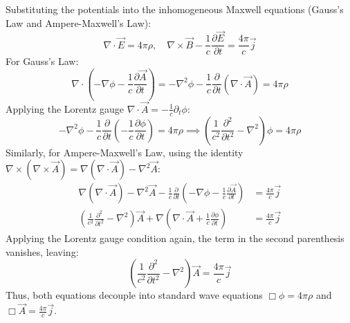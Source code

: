 \begin{solution}
Substituting the potentials into the inhomogeneous Maxwell equations (Gauss's Law and Ampere-Maxwell's Law):
\begin{equation*}
    \nabla \cdot \vec{E} = 4\pi\rho, \quad \nabla \times \vec{B} - \frac{1}{c}\frac{\partial \vec{E}}{\partial t} = \frac{4\pi}{c}\vec{j}
\end{equation*}
For Gauss's Law:
\begin{equation*}
    \nabla \cdot \left( -\nabla \phi - \frac{1}{c}\frac{\partial \vec{A}}{\partial t} \right) = -\nabla^2 \phi - \frac{1}{c}\frac{\partial}{\partial t} (\nabla \cdot \vec{A}) = 4\pi\rho
\end{equation*}
Applying the Lorentz gauge $\nabla \cdot \vec{A} = -\frac{1}{c} \partial_t \phi$:
\begin{equation*}
    -\nabla^2 \phi - \frac{1}{c}\frac{\partial}{\partial t} \left( -\frac{1}{c} \frac{\partial \phi}{\partial t} \right) = 4\pi\rho \implies \left( \frac{1}{c^2} \frac{\partial^2}{\partial t^2} - \nabla^2 \right) \phi = 4\pi\rho
\end{equation*}
Similarly, for Ampere-Maxwell's Law, using the identity $\nabla \times (\nabla \times \vec{A}) = \nabla(\nabla \cdot \vec{A}) - \nabla^2 \vec{A}$:
\begin{align*}
    \nabla(\nabla \cdot \vec{A}) - \nabla^2 \vec{A} - \frac{1}{c}\frac{\partial}{\partial t} \left( -\nabla \phi - \frac{1}{c}\frac{\partial \vec{A}}{\partial t} \right) &= \frac{4\pi}{c}\vec{j} \\
    \left( \frac{1}{c^2}\frac{\partial^2}{\partial t^2} - \nabla^2 \right) \vec{A} + \nabla \left( \nabla \cdot \vec{A} + \frac{1}{c}\frac{\partial \phi}{\partial t} \right) &= \frac{4\pi}{c}\vec{j}
\end{align*}
Applying the Lorentz gauge condition again, the term in the second parenthesis vanishes, leaving:
\begin{equation*}
    \left( \frac{1}{c^2} \frac{\partial^2}{\partial t^2} - \nabla^2 \right) \vec{A} = \frac{4\pi}{c}\vec{j}
\end{equation*}
Thus, both equations decouple into standard wave equations $\Box \phi = 4\pi\rho$ and $\Box \vec{A} = \frac{4\pi}{c}\vec{j}$.



\end{solution}
